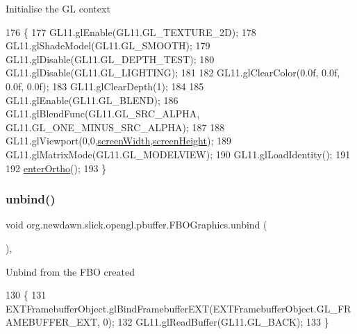 Initialise the GL context 
\begin{DoxyCode}
176                             \{
177         GL11.glEnable(GL11.GL\_TEXTURE\_2D);
178         GL11.glShadeModel(GL11.GL\_SMOOTH);        
179         GL11.glDisable(GL11.GL\_DEPTH\_TEST);
180         GL11.glDisable(GL11.GL\_LIGHTING);                    
181         
182         GL11.glClearColor(0.0f, 0.0f, 0.0f, 0.0f);                
183         GL11.glClearDepth(1);                                       
184         
185         GL11.glEnable(GL11.GL\_BLEND);
186         GL11.glBlendFunc(GL11.GL\_SRC\_ALPHA, GL11.GL\_ONE\_MINUS\_SRC\_ALPHA);
187         
188         GL11.glViewport(0,0,\mbox{\hyperlink{classorg_1_1newdawn_1_1slick_1_1_graphics_adbb4b10050a8bcf8e496130509784f71}{screenWidth}},\mbox{\hyperlink{classorg_1_1newdawn_1_1slick_1_1_graphics_a24cd14275ad2dcd82fcd843ceab6a80b}{screenHeight}});
189         GL11.glMatrixMode(GL11.GL\_MODELVIEW);               
190         GL11.glLoadIdentity();
191         
192         \mbox{\hyperlink{classorg_1_1newdawn_1_1slick_1_1opengl_1_1pbuffer_1_1_f_b_o_graphics_a68aa1165ae60456ee23cefee575e38d2}{enterOrtho}}();
193     \}
\end{DoxyCode}
\mbox{\label{classorg_1_1newdawn_1_1slick_1_1opengl_1_1pbuffer_1_1_f_b_o_graphics_a97b6e81e29ca7188a71d8a029d07befe}} 
\subsubsection{\texorpdfstring{unbind()}{unbind()}}
{\footnotesize\ttfamily void org.\+newdawn.\+slick.\+opengl.\+pbuffer.\+F\+B\+O\+Graphics.\+unbind (\begin{DoxyParamCaption}{ }\end{DoxyParamCaption})\hspace{0.3cm}{\ttfamily [inline]}, {\ttfamily [private]}}

Unbind from the F\+BO created 
\begin{DoxyCode}
130                           \{
131         EXTFramebufferObject.glBindFramebufferEXT(EXTFramebufferObject.GL\_FRAMEBUFFER\_EXT, 0);
132         GL11.glReadBuffer(GL11.GL\_BACK); 
133     \}
\end{DoxyCode}


